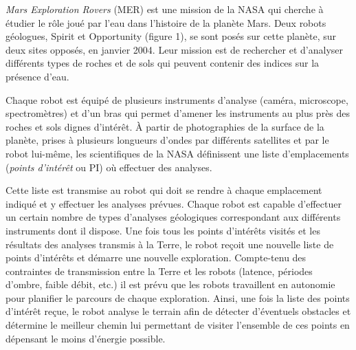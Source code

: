 \textit{Mars Exploration Rovers} (MER) est une mission de la NASA qui cherche à étudier le rôle joué par l’eau dans
l’histoire de la planète Mars. Deux robots géologues, Spirit et Opportunity (figure 1), se sont posés sur cette
planète, sur deux sites opposés, en janvier 2004. Leur mission est de rechercher et d’analyser différents types de
roches et de sols qui peuvent contenir des indices sur la présence d’eau. 


Chaque robot est équipé de plusieurs instruments d’analyse (caméra, microscope, spectromètres) et d’un bras
qui permet d’amener les instruments au plus près des roches et sols dignes d’intérêt. À partir de photographies de
la surface de la planète, prises à plusieurs longueurs d’ondes par différents satellites et par le robot lui-même, les
scientifiques de la NASA définissent une liste d’emplacements (\textit{points d’intérêt} ou PI) où effectuer des analyses.

Cette liste est transmise au robot qui doit se rendre à chaque emplacement indiqué et y effectuer les analyses
prévues. Chaque robot est capable d’effectuer un certain nombre de types d’analyses géologiques correspondant
aux différents instruments dont il dispose. Une fois tous les points d’intérêts visités et les résultats des analyses
transmis à la Terre, le robot reçoit une nouvelle liste de points d’intérêts et démarre une nouvelle exploration.
Compte-tenu des contraintes de transmission entre la Terre et les robots (latence, périodes d’ombre, faible débit,
etc.) il est prévu que les robots travaillent en autonomie pour planifier le parcours de chaque exploration. Ainsi,
une fois la liste des points d’intérêt reçue, le robot analyse le terrain afin de détecter d’éventuels obstacles et
détermine le meilleur chemin lui permettant de visiter l’ensemble de ces points en dépensant le moins d’énergie
possible.

